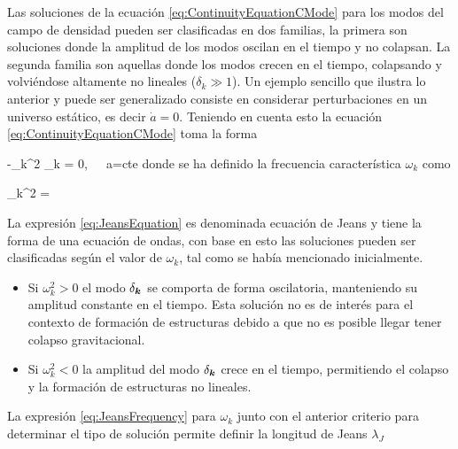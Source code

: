 	
Las soluciones de la ecuación \ref{eq:ContinuityEquationCMode} para los 
modos del campo de densidad pueden ser clasificadas en dos familias, la 
primera son soluciones donde la amplitud de los modos oscilan en el tiempo
y no colapsan. La segunda familia son aquellas donde los modos crecen en el 
tiempo, colapsando y volviéndose altamente no lineales ($\delta_k \gg 1$). 
Un ejemplo sencillo que ilustra lo anterior y puede ser generalizado 
consiste en considerar perturbaciones en un universo estático, es decir 
$\dot a = 0$. Teniendo en cuenta esto la ecuación 
\ref{eq:ContinuityEquationCMode} toma la forma


{ -\omega_k^2 \delta_{\bds k} = 0,\ \ \ a=\mbox{cte}}
donde se ha definido la frecuencia característica $\omega_k$ como


{\omega_k^2 =  }
	

La expresión \ref{eq:JeansEquation} es denominada ecuación de Jeans y 
tiene la forma de una ecuación de ondas, con base en esto las soluciones 
pueden ser clasificadas según el valor de $\omega_k$, tal como se había
mencionado inicialmente.


\begin{itemize}
\item Si $\omega_k^2>0$ el modo $\delta_{\boldsymbol{ k }}$ se comporta de forma 
oscilatoria, manteniendo su amplitud constante en el tiempo. Esta solución
no es de interés para el contexto de formación de estructuras debido a que
no es posible llegar tener colapso gravitacional.

\item Si $\omega_k^2<0$ la amplitud del modo $\delta_{\boldsymbol{ k }}$ crece en el 
tiempo, permitiendo el colapso y la formación de estructuras no lineales.
\end{itemize}


La expresión \ref{eq:JeansFrequency} para $\omega_k$ junto con el anterior 
criterio para determinar el tipo de solución permite definir la longitud 
de Jeans $\lambda_J$


